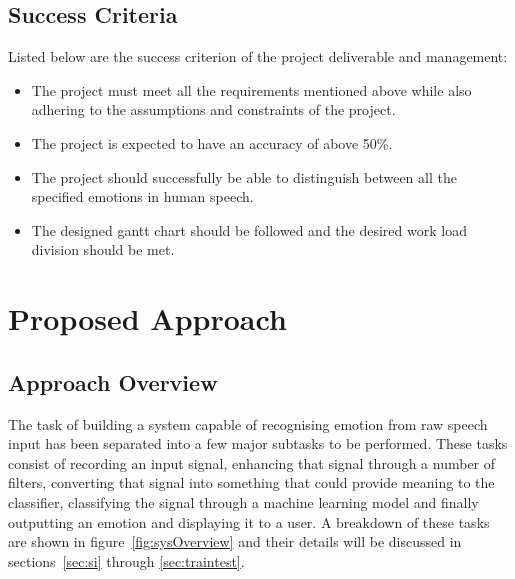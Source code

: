 \documentclass[10pt,twocolumn]{witseiepaper}
\begin{document}
\subsection{Success Criteria}
Listed below are the success criterion of the project deliverable and management:
\begin{itemize}
	\item The project must meet all the requirements mentioned above while also adhering to the assumptions and constraints of the project.
	\item The project is expected to have an accuracy of above 50\%.
	\item The project should successfully be able to distinguish between all the specified emotions in human speech.
	\item The designed gantt chart should be followed and the desired work load division  should be met.
\end{itemize}



\section{Proposed Approach}\label{sec:approach}



\subsection{Approach Overview}
The task of building a system capable of recognising emotion from raw speech input has been separated into a few major subtasks to be performed. These tasks consist of recording an input signal, enhancing that signal through a number of filters, converting that signal into something that could provide meaning to the classifier, classifying the signal through a machine learning model and finally outputting an emotion and displaying it to a user. A breakdown of these tasks are shown in figure~\ref{fig:sysOverview} and their details will be discussed in sections~\ref{sec:si} through \ref{sec:traintest}.
\end{document}
